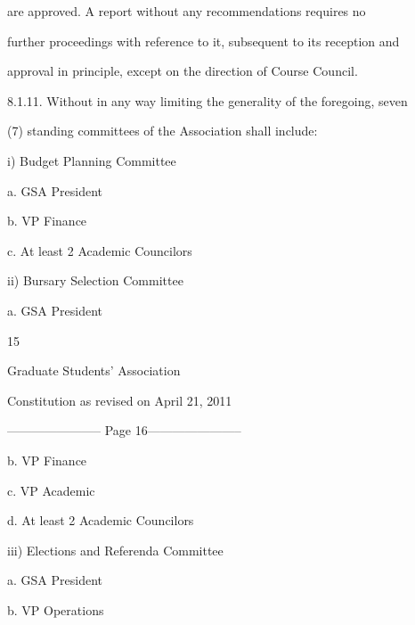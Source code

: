         are  approved.  A  report  without  any  recommendations  requires  no  

        further proceedings with reference to it, subsequent to its reception and  

        approval in principle, except on the direction of Course Council.  



8.1.11.     Without in any way limiting the generality of the foregoing, seven   

        (7) standing committees of the Association shall include:  



i)      Budget Planning Committee  



        a.  GSA President  



        b.  VP Finance  



        c.  At least 2 Academic Councilors  



ii)     Bursary Selection Committee  



        a.  GSA President  



                                                 

                                              15  



                               Graduate Students’ Association  



                          Constitution as revised on April 21, 2011  


----------------------- Page 16-----------------------

        b.  VP Finance  



        c.  VP Academic  



        d.  At least 2 Academic Councilors  



iii)    Elections and Referenda Committee  



        a.  GSA President  



        b.  VP Operations  



